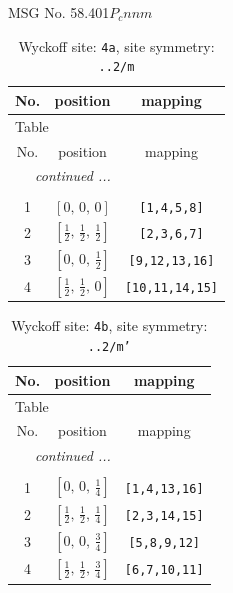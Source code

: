 \documentclass[fleqn,8pt]{jsarticle}
\begin{document}
\setcounter{MaxMatrixCols}{32}

\renewcommand{\tablename}{Table~}
\renewcommand{\figurename}{Figure~}
\begin{center}
\LARGE
MSG No. 58.401\quad$P_{c}nnm$
\end{center}
\renewcommand{\arraystretch}{1.2}
\begin{longtable}{ccc}
\caption{Wyckoff site: {\tt 4a}, site symmetry: {\tt ..2/m}}
 \\
 \hline \hline
No. & position & mapping \\ \hline \endfirsthead

\multicolumn{2}{l}{\tablename\ \thetable{}} \\
 \hline \hline
No. & position & mapping \\ \hline \endhead

 \hline \hline
\multicolumn{2}{r}{\footnotesize\it continued ...} \\ \endfoot

 \hline \hline
\multicolumn{2}{r}{} \\ \endlastfoot

1 & $\left[ 0,\, 0,\, 0 \right]$ & {\tt [1,4,5,8]} \\ \hline
2 & $\left[ \frac{1}{2},\, \frac{1}{2},\, \frac{1}{2} \right]$ & {\tt [2,3,6,7]} \\ \hline
3 & $\left[ 0,\, 0,\, \frac{1}{2} \right]$ & {\tt [9,12,13,16]} \\ \hline
4 & $\left[ \frac{1}{2},\, \frac{1}{2},\, 0 \right]$ & {\tt [10,11,14,15]} \\
\end{longtable}
\renewcommand{\arraystretch}{1.2}
\begin{longtable}{ccc}
\caption{Wyckoff site: {\tt 4b}, site symmetry: {\tt ..2/m'}}
 \\
 \hline \hline
No. & position & mapping \\ \hline \endfirsthead

\multicolumn{2}{l}{\tablename\ \thetable{}} \\
 \hline \hline
No. & position & mapping \\ \hline \endhead

 \hline \hline
\multicolumn{2}{r}{\footnotesize\it continued ...} \\ \endfoot

 \hline \hline
\multicolumn{2}{r}{} \\ \endlastfoot

1 & $\left[ 0,\, 0,\, \frac{1}{4} \right]$ & {\tt [1,4,13,16]} \\ \hline
2 & $\left[ \frac{1}{2},\, \frac{1}{2},\, \frac{1}{4} \right]$ & {\tt [2,3,14,15]} \\ \hline
3 & $\left[ 0,\, 0,\, \frac{3}{4} \right]$ & {\tt [5,8,9,12]} \\ \hline
4 & $\left[ \frac{1}{2},\, \frac{1}{2},\, \frac{3}{4} \right]$ & {\tt [6,7,10,11]} \\
\end{longtable}
\end{document}
